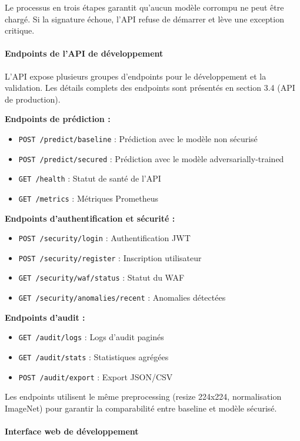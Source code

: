 Le processus en trois étapes garantit qu'aucun modèle corrompu ne peut être chargé. Si la signature échoue, l'API refuse de démarrer et lève une exception critique.

\paragraph{Endpoints de l'API de développement}

L'API expose plusieurs groupes d'endpoints pour le développement et la validation. Les détails complets des endpoints sont présentés en section 3.4 (API de production).

\textbf{Endpoints de prédiction :}
\begin{itemize}
    \item \texttt{POST /predict/baseline} : Prédiction avec le modèle non sécurisé
    \item \texttt{POST /predict/secured} : Prédiction avec le modèle adversarially-trained
    \item \texttt{GET /health} : Statut de santé de l'API
    \item \texttt{GET /metrics} : Métriques Prometheus
\end{itemize}

\textbf{Endpoints d'authentification et sécurité :}
\begin{itemize}
    \item \texttt{POST /security/login} : Authentification JWT
    \item \texttt{POST /security/register} : Inscription utilisateur
    \item \texttt{GET /security/waf/status} : Statut du WAF
    \item \texttt{GET /security/anomalies/recent} : Anomalies détectées
\end{itemize}

\textbf{Endpoints d'audit :}
\begin{itemize}
    \item \texttt{GET /audit/logs} : Logs d'audit paginés
    \item \texttt{GET /audit/stats} : Statistiques agrégées
    \item \texttt{POST /audit/export} : Export JSON/CSV
\end{itemize}

Les endpoints utilisent le même preprocessing (resize 224x224, normalisation ImageNet) pour garantir la comparabilité entre baseline et modèle sécurisé.

\paragraph{Interface web de développement}

